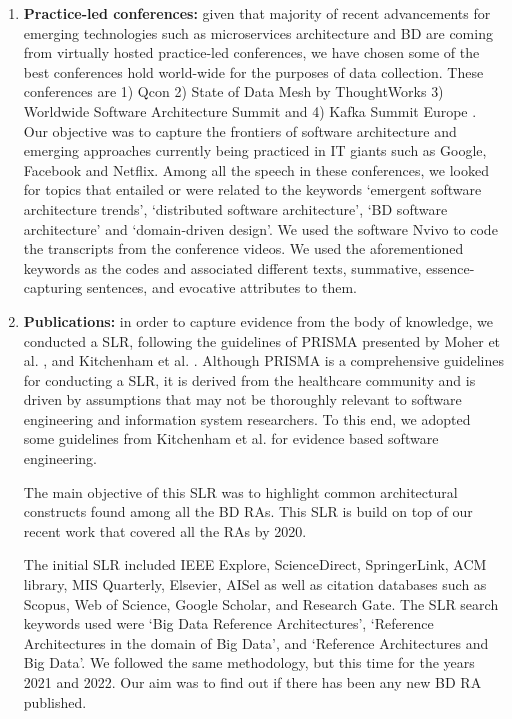 \documentclass[review]{elsarticle}
\begin{document}
\begin{enumerate}
    \item{\bf{Practice-led conferences:}} given that majority of recent advancements for emerging technologies such as microservices architecture \cite{gan2019open, laigner2021data, laigner2021data} and BD are coming from virtually hosted practice-led conferences, we have chosen some of the best conferences hold world-wide for the purposes of data collection. These conferences are 1) Qcon \cite{QCON} 2) State of Data Mesh by ThoughtWorks \cite{ThoughtWorks} 3) Worldwide Software Architecture Summit \cite{Geekle} and 4) Kafka Summit Europe \cite{KafkaSummit}. Our objective was to capture the frontiers of software architecture and emerging approaches currently being practiced in IT giants such as Google, Facebook and Netflix. Among all the speech in these conferences, we looked for topics that entailed or were related to the keywords `emergent software architecture trends', `distributed software architecture', `BD software architecture' and `domain-driven design'. We used the software Nvivo to code the transcripts from the conference videos. We used the aforementioned keywords as the codes and associated different texts, summative, essence-capturing sentences, and evocative attributes to them.
    
    \item{\bf{Publications:}} in order to capture evidence from the body of knowledge, we conducted a SLR, following the guidelines of PRISMA presented by Moher et al. \cite{moher2015preferred}, and Kitchenham et al. \cite{kitchenham2015evidence}. Although PRISMA is a comprehensive guidelines for conducting a SLR, it is derived from the healthcare community and is driven by assumptions that may not be thoroughly relevant to software engineering and information system researchers. To this end, we adopted some guidelines from Kitchenham et al. for evidence based software engineering.
    
    The main objective of this SLR was to highlight common architectural constructs found among all the BD RAs. This SLR is build on top of our recent work \cite{AtaeiACIS} that covered all the RAs by 2020.

    The initial SLR included IEEE Explore, ScienceDirect, SpringerLink, ACM library, MIS Quarterly, Elsevier, AISel as well as citation databases such as Scopus, Web of Science, Google Scholar, and Research Gate. The SLR search keywords used were `Big Data Reference Architectures’, `Reference Architectures in the domain of Big Data’, and `Reference Architectures and Big Data’. We followed the same methodology, but this time for the years 2021 and 2022. Our aim was to find out if there has been any new BD RA published.


\end{enumerate}
\end{document}
